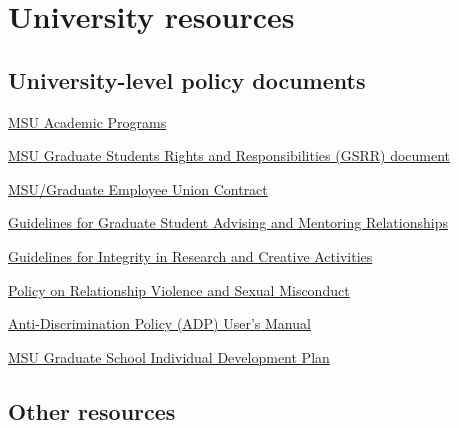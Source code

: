 \section{University resources}
\label{sec:resources}

\subsection{University-level policy documents}
\label{sec:resources_policy}


\vspace{2mm}
\noindent
\href{http://www.reg.msu.edu/ucc/ucc.asp}{MSU Academic Programs}

\vspace{2mm}
\noindent
\href{http://www.vps.msu.edu/SpLife/default.pdf}{MSU Graduate Students
  Rights and Responsibilities (GSRR) document}

\vspace{2mm}
\noindent
\href{https://www.hr.msu.edu/documents/contracts/GEU2015-2019.pdf}{MSU/Graduate
  Employee Union Contract}

\vspace{2mm}
\noindent
\href{https://grad.msu.edu/sites/default/files/content/researchintegrity/guidelines.pdf}{Guidelines for Graduate Student Advising and Mentoring Relationships}

\vspace{2mm}
\noindent
\href{https://grad.msu.edu/sites/default/files/content/researchintegrity/guidelines.pdf}{Guidelines for Integrity in Research and Creative Activities}

\vspace{2mm}
\noindent
\href{http://www.hr.msu.edu/documents/uwidepolproc/RVSM_Policy.htm}{Policy
  on Relationship Violence and Sexual Misconduct}


\vspace{2mm}
\noindent
\href{http://oie.msu.edu/policies-procedures-forms/documents/ADP\%20Users\%20Manual\%20-\%20updated\%2015.07.24.pdf}{Anti-Discrimination
                                Policy (ADP) User's Manual}

\vspace{2mm}
\noindent
\href{http://caffe.grd.msu.edu/IDP}{MSU Graduate School Individual
  Development Plan}

\vspace{2mm}
\subsection{Other resources}
\label{sec:resources_other}

